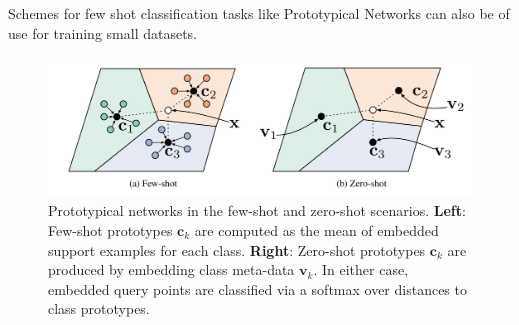 Schemes for few shot classification tasks like Prototypical Networks can also be of use for training small datasets.

\begin{figure}[!ht]
    \centerline{\includegraphics[width=1.15\columnwidth]{images/background/prototypical-networks.png}}
    \caption{Prototypical networks in the few-shot and zero-shot scenarios. \textbf{Left}: Few-shot prototypes
    $\mathbf{c}_k$ are computed as the mean of embedded support examples for each class. \textbf{Right}: Zero-shot prototypes $\mathbf{c}_k$ are produced by embedding class meta-data $\mathbf{v}_k$. In either case, embedded query points are classified via a softmax over distances to class prototypes.}
    \label{fig:protonet}
\end{figure}

